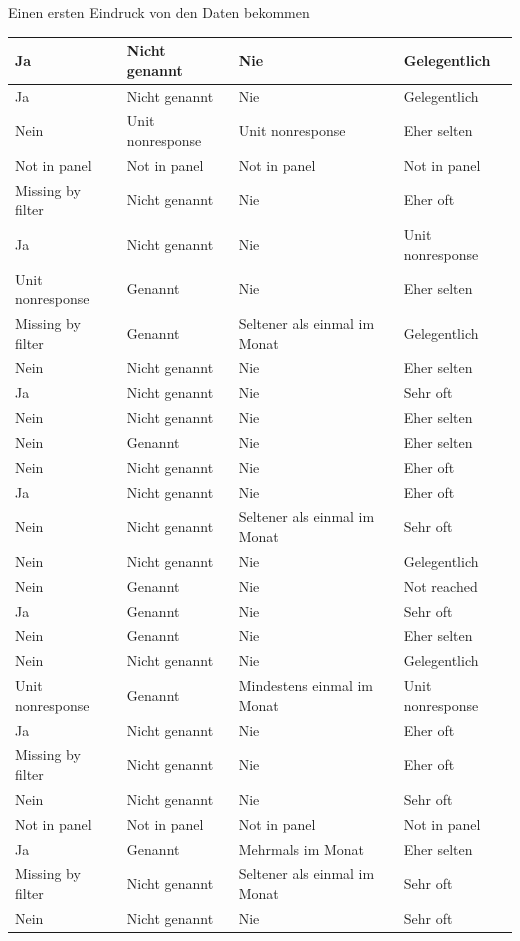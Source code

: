 \documentclass[ignorenonframetext,]{beamer}
\begin{document}
\begin{frame}{Einen ersten Eindruck von den Daten bekommen}
\begin{tabular}{l|l|l|l}
Ja & Nicht genannt & Nie & Gelegentlich\\
\hline
Ja & Nicht genannt & Nie & Gelegentlich\\
\hline
Nein & Unit nonresponse & Unit nonresponse & Eher selten\\
\hline
Not in panel & Not in panel & Not in panel & Not in panel\\
\hline
Missing by filter & Nicht genannt & Nie & Eher oft\\
\hline
Ja & Nicht genannt & Nie & Unit nonresponse\\
\hline
Unit nonresponse & Genannt & Nie & Eher selten\\
\hline
Missing by filter & Genannt & Seltener als einmal im Monat & Gelegentlich\\
\hline
Nein & Nicht genannt & Nie & Eher selten\\
\hline
Ja & Nicht genannt & Nie & Sehr oft\\
\hline
Nein & Nicht genannt & Nie & Eher selten\\
\hline
Nein & Genannt & Nie & Eher selten\\
\hline
Nein & Nicht genannt & Nie & Eher oft\\
\hline
Ja & Nicht genannt & Nie & Eher oft\\
\hline
Nein & Nicht genannt & Seltener als einmal im Monat & Sehr oft\\
\hline
Nein & Nicht genannt & Nie & Gelegentlich\\
\hline
Nein & Genannt & Nie & Not reached\\
\hline
Ja & Genannt & Nie & Sehr oft\\
\hline
Nein & Genannt & Nie & Eher selten\\
\hline
Nein & Nicht genannt & Nie & Gelegentlich\\
\hline
Unit nonresponse & Genannt & Mindestens einmal im Monat & Unit nonresponse\\
\hline
Ja & Nicht genannt & Nie & Eher oft\\
\hline
Missing by filter & Nicht genannt & Nie & Eher oft\\
\hline
Nein & Nicht genannt & Nie & Sehr oft\\
\hline
Not in panel & Not in panel & Not in panel & Not in panel\\
\hline
Ja & Genannt & Mehrmals im Monat & Eher selten\\
\hline
Missing by filter & Nicht genannt & Seltener als einmal im Monat & Sehr oft\\
\hline
Nein & Nicht genannt & Nie & Sehr oft\\

\end{tabular}
\end{frame}
\end{document}
